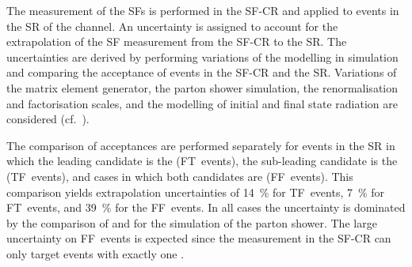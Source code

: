 

%   

The measurement of the SFs is performed in the SF-CR and applied to events in
the SR of the \hadhad channel. An uncertainty is assigned to account for the
extrapolation of the SF measurement from the SF-CR to the \hadhad SR. The
uncertainties are derived by performing variations of the \ttbar modelling in
simulation and comparing the acceptance of \ttbarFakes events in the SF-CR and
the \hadhad SR. Variations of the matrix element generator, the parton shower
simulation, the renormalisation and factorisation scales, and the modelling of
initial and final state radiation are considered
(cf.~).

The comparison of \ttbarFakes acceptances are performed separately for events in
the \hadhad SR in which the leading \tauhadvis candidate is the \faketauhadvis
(FT~events), the sub-leading \tauhadvis candidate is the \faketauhadvis
(TF~events), and cases in which both candidates are \faketauhadvis
(FF~events). This comparison yields extrapolation uncertainties of
\SI{14}{\percent} for TF~events, \SI{7}{\percent} for FT~events, and
\SI{39}{\percent} for the FF~events. In all cases the uncertainty is dominated
by the comparison of \PYTHIA[8] and \HERWIG[7] for the simulation of the parton
shower. The large uncertainty on FF~events is expected since the measurement in
the SF-CR can only target events with exactly one \faketauhadvis.

